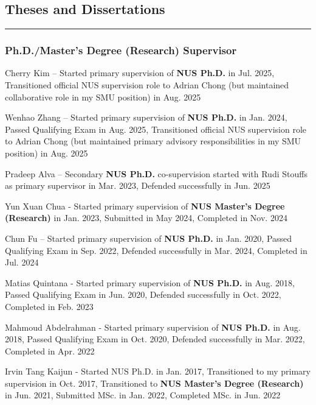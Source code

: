 \documentclass[10pt,a4paper]{article}
\begin{document}
\begin{small}
\subsection*{Theses and Dissertations}
\hrule
\vspace{0.2cm}

\subsubsection*{Ph.D./Master's Degree (Research) Supervisor}
\begin{etaremune}
\item 
Cherry Kim – Started primary supervision of \textbf{NUS Ph.D.} in Jul. 2025, Transitioned official NUS supervision role to Adrian Chong (but maintained collaborative role in my SMU position) in Aug. 2025
\item 
Wenhao Zhang – Started primary supervision of \textbf{NUS Ph.D.} in Jan. 2024, Passed Qualifying Exam in Aug. 2025, Transitioned official NUS supervision role to Adrian Chong (but maintained primary advisory responsibilities in my SMU position) in Aug. 2025
\item
Pradeep Alva – Secondary \textbf{NUS Ph.D.} co-supervision started with Rudi Stouffs as primary supervisor in Mar. 2023, Defended successfully in Jun. 2025
\item
Yun Xuan Chua - Started primary supervision of \textbf{NUS Master's Degree (Research)} in Jan. 2023, Submitted in May 2024, Completed in Nov. 2024
\item 
Chun Fu – Started primary supervision of \textbf{NUS Ph.D.} in Jan. 2020, Passed Qualifying Exam in Sep. 2022, Defended successfully in Mar. 2024, Completed in Jul. 2024
\item
Matias Quintana - Started primary supervision of \textbf{NUS Ph.D.} in Aug. 2018, Passed Qualifying Exam in Jun. 2020, Defended successfully in Oct. 2022, Completed in Feb. 2023
\item
Mahmoud Abdelrahman - Started primary supervision of \textbf{NUS Ph.D.} in Aug. 2018, Passed Qualifying Exam in Oct. 2020, Defended successfully in Mar. 2022, Completed in Apr. 2022
\item
Irvin Tang Kaijun - Started NUS Ph.D. in Jan. 2017, Transitioned to my primary supervision in Oct. 2017, Transitioned to \textbf{NUS Master's Degree (Research)} in Jun. 2021, Submitted MSc. in Jan. 2022, Completed MSc. in Jun. 2022
\end{etaremune}


\end{small}
\end{document}
